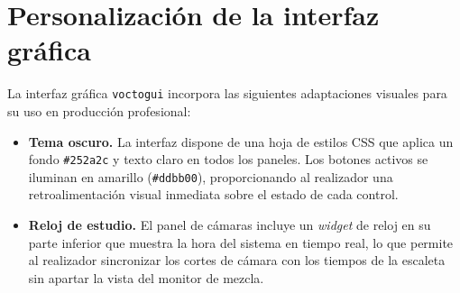 \section{Personalización de la interfaz gráfica}
\label{sec:gui_personalizacion}

La interfaz gráfica \texttt{voctogui} incorpora las siguientes adaptaciones visuales para su uso en producción profesional:

\begin{itemize}

  \item \textbf{Tema oscuro.} La interfaz dispone de una hoja de estilos \ac{CSS} que aplica un fondo
  \texttt{\#252a2c} y texto claro en todos los paneles. Los botones activos se iluminan
  en amarillo (\texttt{\#ddbb00}), proporcionando al realizador una retroalimentación
  visual inmediata sobre el estado de cada control.

  \item \textbf{Reloj de estudio.} El panel de cámaras incluye un \textit{widget} de reloj en su parte inferior
  que muestra la hora del sistema en tiempo real, lo que permite al
  realizador sincronizar los cortes de cámara con los tiempos de la escaleta sin apartar
  la vista del monitor de mezcla.

\end{itemize}

